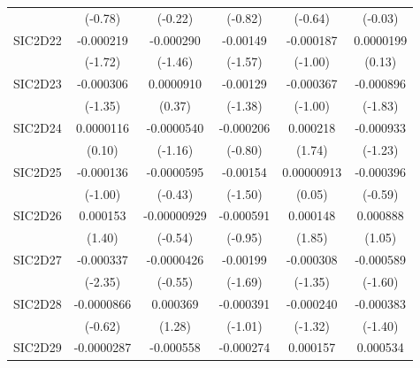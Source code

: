 \begin{table}[htbp]
\begin{tabular}{l*{5}{c}}
            &     (-0.78)         &     (-0.22)         &     (-0.82)         &     (-0.64)         &     (-0.03)         \\
SIC2D22     &   -0.000219         &   -0.000290         &    -0.00149         &   -0.000187         &   0.0000199         \\
            &     (-1.72)         &     (-1.46)         &     (-1.57)         &     (-1.00)         &      (0.13)         \\
SIC2D23     &   -0.000306         &   0.0000910         &    -0.00129         &   -0.000367         &   -0.000896         \\
            &     (-1.35)         &      (0.37)         &     (-1.38)         &     (-1.00)         &     (-1.83)         \\
SIC2D24     &   0.0000116         &  -0.0000540         &   -0.000206         &    0.000218         &   -0.000933         \\
            &      (0.10)         &     (-1.16)         &     (-0.80)         &      (1.74)         &     (-1.23)         \\
SIC2D25     &   -0.000136         &  -0.0000595         &    -0.00154         &  0.00000913         &   -0.000396         \\
            &     (-1.00)         &     (-0.43)         &     (-1.50)         &      (0.05)         &     (-0.59)         \\
SIC2D26     &    0.000153         & -0.00000929         &   -0.000591         &    0.000148         &    0.000888         \\
            &      (1.40)         &     (-0.54)         &     (-0.95)         &      (1.85)         &      (1.05)         \\
SIC2D27     &   -0.000337\sym{*}  &  -0.0000426         &    -0.00199         &   -0.000308         &   -0.000589         \\
            &     (-2.35)         &     (-0.55)         &     (-1.69)         &     (-1.35)         &     (-1.60)         \\
SIC2D28     &  -0.0000866         &    0.000369         &   -0.000391         &   -0.000240         &   -0.000383         \\
            &     (-0.62)         &      (1.28)         &     (-1.01)         &     (-1.32)         &     (-1.40)         \\
SIC2D29     &  -0.0000287         &   -0.000558\sym{*}  &   -0.000274         &    0.000157         &    0.000534         \\

\end{tabular}
\end{table}
